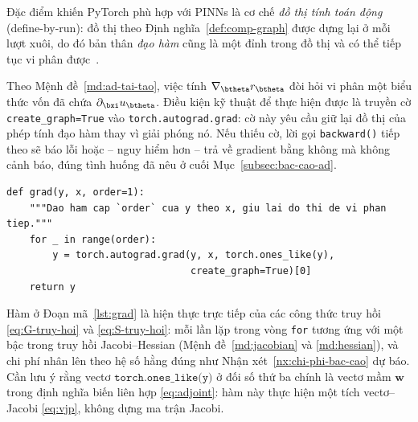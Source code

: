 Đặc điểm khiến PyTorch phù hợp với PINNs là cơ chế \emph{đồ thị tính toán động}
(define-by-run): đồ thị theo Định nghĩa~\ref{def:comp-graph} được dựng lại ở mỗi
lượt xuôi, do đó bản thân \emph{đạo hàm} cũng là một đỉnh trong đồ thị và có thể
tiếp tục vi phân được~\cite{paszke2019}.
 
Theo Mệnh đề~\ref{md:ad-tai-tao}, việc tính $\nabla_{\btheta}r_{\btheta}$ đòi hỏi
vi phân một biểu thức vốn đã chứa $\partial_{\bxi}u_{\btheta}$. Điều kiện kỹ thuật
để thực hiện được là truyền cờ \texttt{create\_graph=True} vào
\texttt{torch.autograd.grad}: cờ này yêu cầu giữ lại đồ thị của phép tính đạo hàm
thay vì giải phóng nó. Nếu thiếu cờ, lời gọi \texttt{backward()} tiếp theo sẽ báo
lỗi hoặc -- nguy hiểm hơn -- trả về gradient bằng không mà không cảnh báo, đúng
tình huống đã nêu ở cuối Mục~\ref{subsec:bac-cao-ad}.
 
\begin{lstlisting}[caption={Toán tử đạo hàm lồng nhau theo biến đầu vào.},label={lst:grad}]
def grad(y, x, order=1):
    """Dao ham cap `order` cua y theo x, giu lai do thi de vi phan tiep."""
    for _ in range(order):
        y = torch.autograd.grad(y, x, torch.ones_like(y),
                                create_graph=True)[0]
    return y
\end{lstlisting}
 
Hàm ở Đoạn mã~\ref{lst:grad} là hiện thực trực tiếp của các công thức truy hồi
\eqref{eq:G-truy-hoi} và \eqref{eq:S-truy-hoi}: mỗi lần lặp trong vòng
\texttt{for} tương ứng với một bậc trong truy hồi Jacobi--Hessian
(Mệnh đề~\ref{md:jacobian} và \ref{md:hessian}), và chi phí nhân lên theo hệ số
hằng đúng như Nhận xét~\ref{nx:chi-phi-bac-cao} dự báo. Cần lưu ý rằng vectơ
$\texttt{torch.ones\_like(y)}$ ở đối số thứ ba chính là vectơ mầm $\bm{w}$ trong
định nghĩa biến liên hợp \eqref{eq:adjoint}: hàm này thực hiện một tích
vectơ--Jacobi \eqref{eq:vjp}, không dựng ma trận Jacobi.


